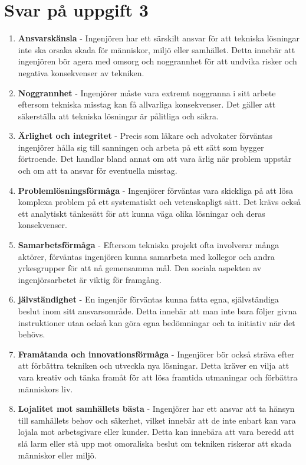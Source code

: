 \documentclass[a4paper,12pt]{article}
\begin{document}
\section*{Svar på uppgift 3}
\begin{enumerate}
    \item \textbf{Ansvarskänsla} - Ingenjören har ett särskilt ansvar för att
    tekniska lösningar inte ska orsaka skada för människor, miljö eller
    samhället. Detta innebär att ingenjören bör agera med omsorg och
    noggrannhet för att undvika risker och negativa konsekvenser av tekniken.
    \item \textbf{Noggrannhet} - Ingenjörer måste vara extremt noggranna i sitt
    arbete eftersom tekniska misstag kan få allvarliga konsekvenser. Det gäller
    att säkerställa att tekniska lösningar är pålitliga och säkra.
    \item \textbf{Ärlighet och integritet} - Precis som läkare och advokater
    förväntas ingenjörer hålla sig till sanningen och arbeta på ett sätt som
    bygger förtroende. Det handlar bland annat om att vara ärlig när problem
    uppstår och om att ta ansvar för eventuella misstag.
    \item \textbf{Problemlösningsförmåga} - Ingenjörer förväntas vara skickliga
    på att lösa komplexa problem på ett systematiskt och vetenskapligt sätt.
    Det krävs också ett analytiskt tänkesätt för att kunna väga olika lösningar
    och deras konsekvenser.
    \item \textbf{Samarbetsförmåga} - Eftersom tekniska projekt ofta involverar
    många aktörer, förväntas ingenjören kunna samarbeta med kollegor och andra
    yrkesgrupper för att nå gemensamma mål. Den sociala aspekten av
    ingenjörsarbetet är viktig för framgång.
    \item \textbf{jälvständighet} - En ingenjör förväntas kunna fatta egna,
    självständiga beslut inom sitt ansvarsområde. Detta innebär att man inte
    bara följer givna instruktioner utan också kan göra egna bedömningar och ta
    initiativ när det behövs.
    \item \textbf{Framåtanda och innovationsförmåga} - Ingenjörer bör också
    sträva efter att förbättra tekniken och utveckla nya lösningar. Detta
    kräver en vilja att vara kreativ och tänka framåt för att lösa framtida
    utmaningar och förbättra människors liv.
    \item \textbf{Lojalitet mot samhällets bästa} - Ingenjörer har ett ansvar
    att ta hänsyn till samhällets behov och säkerhet, vilket innebär att de
    inte enbart kan vara lojala mot arbetsgivare eller kunder. Detta kan
    innebära att vara beredd att slå larm eller stå upp mot omoraliska beslut
    om tekniken riskerar att skada människor eller miljö.
\end{enumerate}
%
\end{document}
